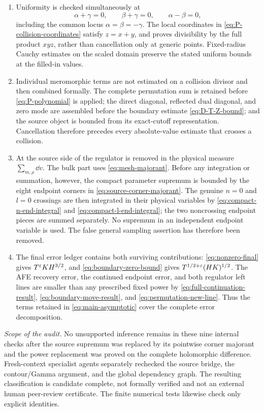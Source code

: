 \begin{enumerate}[label=\textup{D\arabic*.},leftmargin=10mm]
\item
Uniformity is checked simultaneously at
\[
 \alpha+\gamma=0,\qquad
 \beta+\gamma=0,\qquad
 \alpha-\beta=0,
\]
including the common locus $\alpha=\beta=-\gamma$.
The local coordinates in \eqref{eq:P-collision-coordinates} satisfy
$z=x+y$, and  proves divisibility by the full product
$xyz$, rather than cancellation only at generic points.  Fixed-radius Cauchy
estimates on the scaled domain preserve the stated uniform bounds at the
filled-in values.

\item
Individual meromorphic terms are not estimated on a collision divisor and
then combined formally.  The complete permutation sum is retained before
\eqref{eq:P-polynomial} is applied; the direct diagonal, reflected dual
diagonal, and zero mode are assembled before the boundary estimate
\eqref{eq:D-T-Z-bound}; and the source object is bounded from its exact-cutoff
representation.  Cancellation therefore precedes every absolute-value
estimate that crosses a collision.

\item
At the source side of  the regulator is removed in the
physical measure $\sum_{m,\rho}\dd v$.  The bulk part uses
\eqref{eq:mesh-majorant}.  Before any integration or summation, however, the
compact parameter supremum is bounded by the eight endpoint corners in
\eqref{eq:source-corner-majorant}.  The genuine $n=0$ and $l=0$ crossings
are then integrated in their physical variables by
\eqref{eq:compact-n-end-integral} and
\eqref{eq:compact-l-end-integral}; the two noncrossing endpoint pieces are
summed separately.  No supremum in an independent endpoint variable is used.
The false general sampling assertion has therefore been removed.

\item
The final error ledger contains both surviving contributions:
\eqref{eq:nonzero-final} gives
$T^\varepsilon KH^{3/2}$, and \eqref{eq:boundary-zero-bound} gives
$T^{1/2+\varepsilon}(HK)^{1/2}$.  The AFE recovery error, the continued endpoint
error, and both regulator left lines are smaller than any prescribed fixed
power by \eqref{eq:full-continuation-result},
\eqref{eq:boundary-move-result}, and \eqref{eq:permutation-new-line}.
Thus the terms retained in \eqref{eq:main-asymptotic} cover the complete
error decomposition.
\end{enumerate}

\emph{Scope of the audit.}
No unsupported inference remains in these nine internal checks after the
source supremum was replaced by its pointwise corner majorant and the power
replacement was proved on the complete holomorphic difference.  Fresh-context
specialist agents separately rechecked the source bridge, the contour/Gamma
argument, and the global dependency graph.  The resulting classification is
candidate complete, not formally verified and not an external human
peer-review certificate.  The finite numerical tests likewise check only
explicit identities.

